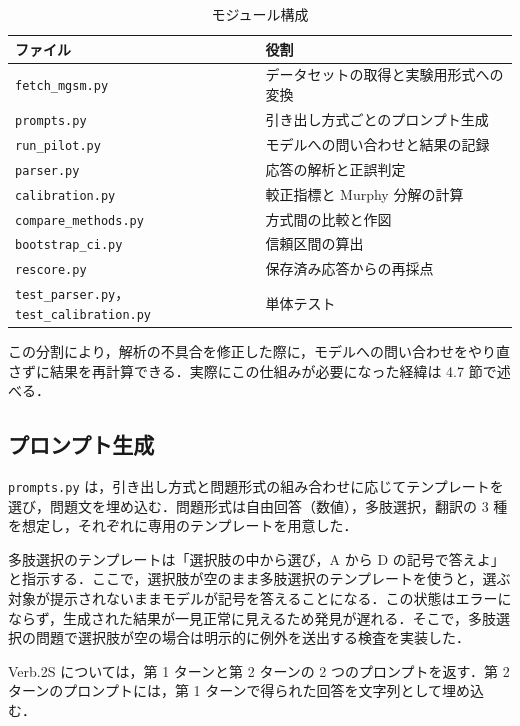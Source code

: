 \begin{table}[t]
\centering
\small
\caption{モジュール構成}
\label{tab:4.2}
\begin{tabular}{|l|l|}
\hline
ファイル & 役割 \\
\hline
\texttt{fetch\_\allowbreak{}mgsm.\allowbreak{}py} & データセットの取得と実験用形式への変換 \\
\texttt{prompts.\allowbreak{}py} & 引き出し方式ごとのプロンプト生成 \\
\texttt{run\_\allowbreak{}pilot.\allowbreak{}py} & モデルへの問い合わせと結果の記録 \\
\texttt{parser.\allowbreak{}py} & 応答の解析と正誤判定 \\
\texttt{calibration.\allowbreak{}py} & 較正指標と Murphy 分解の計算 \\
\texttt{compare\_\allowbreak{}methods.\allowbreak{}py} & 方式間の比較と作図 \\
\texttt{bootstrap\_\allowbreak{}ci.\allowbreak{}py} & 信頼区間の算出 \\
\texttt{rescore.\allowbreak{}py} & 保存済み応答からの再採点 \\
\texttt{test\_\allowbreak{}parser.\allowbreak{}py}，\texttt{test\_\allowbreak{}calibration.\allowbreak{}py} & 単体テスト \\
\hline
\end{tabular}
\end{table}

この分割により，解析の不具合を修正した際に，モデルへの問い合わせをやり直さずに結果を再計算できる．実際にこの仕組みが必要になった経緯は 4.7 節で述べる．

\subsection{プロンプト生成}

\texttt{prompts.\allowbreak{}py} は，引き出し方式と問題形式の組み合わせに応じてテンプレートを選び，問題文を埋め込む．問題形式は自由回答（数値），多肢選択，翻訳の 3 種を想定し，それぞれに専用のテンプレートを用意した．

多肢選択のテンプレートは「選択肢の中から選び，A から D の記号で答えよ」と指示する．ここで，選択肢が空のまま多肢選択のテンプレートを使うと，選ぶ対象が提示されないままモデルが記号を答えることになる．この状態はエラーにならず，生成された結果が一見正常に見えるため発見が遅れる．そこで，多肢選択の問題で選択肢が空の場合は明示的に例外を送出する検査を実装した．

Verb.2S については，第 1 ターンと第 2 ターンの 2 つのプロンプトを返す．第 2 ターンのプロンプトには，第 1 ターンで得られた回答を文字列として埋め込む．

